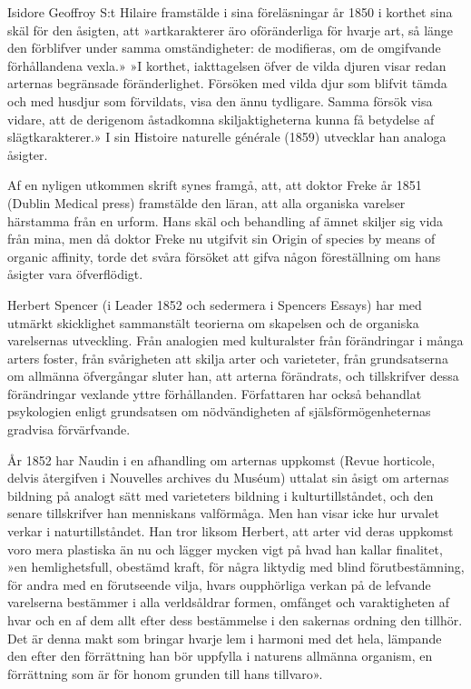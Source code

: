 Isidore Geoffroy S:t Hilaire framstälde i sina föreläsningar år 1850 i korthet sina skäl för den åsigten, att »artkarakterer äro oföränderliga för hvarje art, så länge den förblifver under samma omständigheter: de modifieras, om de omgifvande förhållandena vexla.» »I korthet, iakttagelsen öfver de vilda djuren visar redan arternas begränsade föränderlighet. Försöken med vilda djur som blifvit tämda och med husdjur som förvildats, visa den ännu tydligare. Samma försök visa vidare, att de derigenom åstadkomna skiljaktigheterna kunna få betydelse af slägtkarakterer.» I sin Histoire naturelle générale (1859) utvecklar han analoga åsigter.

Af en nyligen utkommen skrift synes framgå, att, att doktor Freke år 1851 (Dublin Medical press) framstälde den läran, att alla organiska varelser härstamma från en urform. Hans skäl och behandling af ämnet skiljer sig vida från mina, men då doktor Freke nu utgifvit sin Origin of species by means of organic affinity, torde det svåra försöket att gifva någon föreställning om hans åsigter vara öfverflödigt.

Herbert Spencer (i Leader 1852 och sedermera i Spencers Essays) har med utmärkt skicklighet sammanstält teorierna om skapelsen och de organiska varelsernas utveckling. Från analogien med kulturalster från förändringar i många arters foster, från svårigheten att skilja arter och varieteter, från grundsatserna om allmänna öfvergångar sluter han, att arterna förändrats, och tillskrifver dessa förändringar vexlande yttre förhållanden. Författaren har också behandlat psykologien enligt grundsatsen om nödvändigheten af själsförmögenheternas gradvisa förvärfvande.

År 1852 har Naudin i en afhandling om arternas uppkomst (Revue horticole, delvis återgifven i Nouvelles archives du Muséum) uttalat sin åsigt om arternas bildning på analogt sätt med varieteters bildning i kulturtillståndet, och den senare tillskrifver han menniskans valförmåga. Men han visar icke hur urvalet verkar i naturtillståndet. Han tror liksom Herbert, att arter vid deras uppkomst voro mera plastiska än nu och lägger mycken vigt på hvad han kallar finalitet, »en hemlighetsfull, obestämd kraft, för några liktydig med blind förutbestämning, för andra med en förutseende vilja, hvars oupphörliga verkan på de lefvande varelserna bestämmer i alla verldsåldrar formen, omfånget och varaktigheten af hvar och en af dem allt efter dess bestämmelse i den sakernas ordning den tillhör. Det är denna makt som bringar hvarje lem i harmoni med det hela, lämpande den efter den förrättning han bör uppfylla i naturens allmänna organism, en förrättning som är för honom grunden till hans tillvaro».

